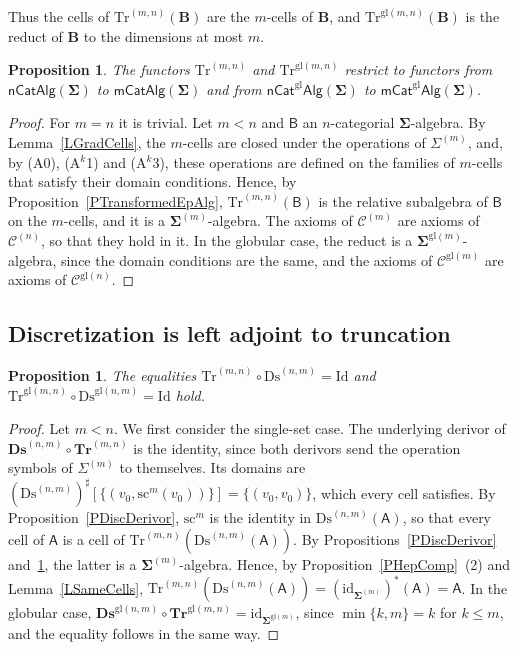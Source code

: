 \documentclass[a4paper,reqno]{amsart}
\newcommand{\sig}[1]{\mathbf{#1}}                %
\newcommand{\calg}[1]{\boldsymbol{\mathsf{#1}}}  %
\newcommand{\id}{\mathrm{id}}
\newcommand{\Id}{\mathrm{Id}}
\newcommand{\gl}{\mathrm{gl}}
\newcommand{\src}{\mathrm{sc}}
\newcommand{\Ds}{\mathrm{Ds}}
\newcommand{\Tr}{\mathrm{Tr}}
\newcommand{\bDs}{\mathbf{Ds}}
\newcommand{\bTr}{\mathbf{Tr}}
\theoremstyle{plain}
\newtheorem{proposition}[theorem]{Proposition}
\theoremstyle{definition}
\begin{document}
Thus the cells of $\Tr^{(m,n)}(\mathbf{B})$ are the $m$-cells of $\mathbf{B}$, and $\Tr^{\gl(m,n)}(\mathbf{B})$ is the reduct of $\mathbf{B}$ to the dimensions at most $m$.

\begin{proposition}\label{PTruncDerivor}
The functors $\Tr^{(m,n)}$ and $\Tr^{\gl(m,n)}$ restrict to functors from $\mathsf{nCatAlg}(\sig{\Sigma})$ to $\mathsf{mCatAlg}(\sig{\Sigma})$ and from $\mathsf{nCat}^{\gl}\mathsf{Alg}(\sig{\Sigma})$ to $\mathsf{mCat}^{\gl}\mathsf{Alg}(\sig{\Sigma})$.
\end{proposition}
\begin{proof}
For $m=n$ it is trivial.
Let $m<n$ and $\calg{B}$ an $n$-categorial $\sig{\Sigma}$-algebra.
By Lemma~\ref{LGradCells}, the $m$-cells are closed under the operations of $\Sigma^{(m)}$, and, by (A0), (A$^{k}$1) and (A$^{k}$3), these operations are defined on the families of $m$-cells that satisfy their domain conditions.
Hence, by Proposition~\ref{PTransformedEpAlg}, $\Tr^{(m,n)}(\calg{B})$ is the relative subalgebra of $\calg{B}$ on the $m$-cells, and it is a $\sig{\Sigma}^{(m)}$-algebra.
The axioms of $\mathcal{C}^{(m)}$ are axioms of $\mathcal{C}^{(n)}$, so that they hold in it.
In the globular case, the reduct is a $\sig{\Sigma}^{\gl(m)}$-algebra, since the domain conditions are the same, and the axioms of $\mathcal{C}^{\gl(m)}$ are axioms of $\mathcal{C}^{\gl(n)}$.
\end{proof}

\subsection{Discretization is left adjoint to truncation}

\begin{proposition}\label{PTruncDisc}
The equalities $\Tr^{(m,n)}\circ\Ds^{(n,m)}=\Id$ and $\Tr^{\gl(m,n)}\circ\Ds^{\gl(n,m)}=\Id$ hold.
\end{proposition}
\begin{proof}
Let $m<n$.
We first consider the single-set case.
The underlying derivor of $\bDs^{(n,m)}\circ\bTr^{(m,n)}$ is the identity, since both derivors send the operation symbols of $\Sigma^{(m)}$ to themselves.
Its domains are $(\Ds^{(n,m)})^{\sharp}[\{(v_{0},\src^{m}(v_{0}))\}]=\{(v_{0},v_{0})\}$, which every cell satisfies.
By Proposition~\ref{PDiscDerivor}, $\src^{m}$ is the identity in $\Ds^{(n,m)}(\calg{A})$, so that every cell of $\calg{A}$ is a cell of $\Tr^{(m,n)}(\Ds^{(n,m)}(\calg{A}))$.
By Propositions~\ref{PDiscDerivor} and~\ref{PTruncDerivor}, the latter is a $\sig{\Sigma}^{(m)}$-algebra.
Hence, by Proposition~\ref{PHepComp}~(2) and Lemma~\ref{LSameCells}, $\Tr^{(m,n)}(\Ds^{(n,m)}(\calg{A}))=(\id_{\sig{\Sigma}^{(m)}})^{\ast}(\calg{A})=\calg{A}$.
In the globular case, $\bDs^{\gl(n,m)}\circ\bTr^{\gl(m,n)}=\id_{\sig{\Sigma}^{\gl(m)}}$, since $\min\{k,m\}=k$ for $k\leq m$, and the equality follows in the same way.
\end{proof}
\end{document}
